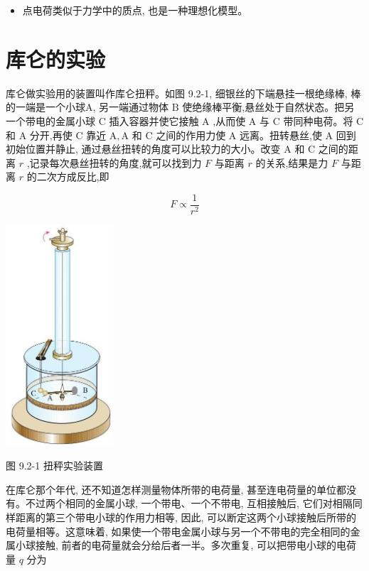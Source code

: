 \documentclass[10pt]{article}
\begin{document}
\begin{mdframed}

\begin{itemize}
\item 点电荷类似于力学中的质点, 也是一种理想化模型。
\end{itemize}

\end{mdframed}

\section*{库仑的实验}

库仑做实验用的装置叫作库仑扭秤。如图 9.2-1, 细银丝的下端悬挂一根绝缘棒, 棒的一端是一个小球A, 另一端通过物体 \(\mathrm{B}\) 使绝缘棒平衡,悬丝处于自然状态。把另一个带电的金属小球 \(\mathrm{C}\) 插入容器并使它接触 \(\mathrm{A}\) ,从而使 \(\mathrm{A}\) 与 \(\mathrm{C}\) 带同种电荷。将 \(\mathrm{C}\) 和 \(\mathrm{A}\) 分开,再使 \(\mathrm{C}\) 靠近 \(\mathrm{A},\mathrm{A}\) 和 \(\mathrm{C}\) 之间的作用力使 \(\mathrm{A}\) 远离。扭转悬丝,使 \(\mathrm{A}\) 回到初始位置并静止, 通过悬丝扭转的角度可以比较力的大小。改变 \(\mathrm{A}\) 和 \(\mathrm{C}\) 之间的距离 \(r\) ,记录每次悬丝扭转的角度,就可以找到力 \(F\) 与距离 \(r\) 的关系,结果是力 \(F\) 与距离 \(r\) 的二次方成反比,即

\[
F \propto \frac{1}{{r}^{2}}
\]

\begin{center}
\includegraphics[max width=0.3\textwidth]{images/01911d5f-8e38-70c0-b5b8-2b399bd115b6_12_298404.jpg}
\end{center}

图 9.2-1 扭秤实验装置

在库仑那个年代, 还不知道怎样测量物体所带的电荷量, 甚至连电荷量的单位都没有。不过两个相同的金属小球, 一个带电、一个不带电, 互相接触后, 它们对相隔同样距离的第三个带电小球的作用力相等, 因此, 可以断定这两个小球接触后所带的电荷量相等。这意味着, 如果使一个带电金属小球与另一个不带电的完全相同的金属小球接触, 前者的电荷量就会分给后者一半。多次重复, 可以把带电小球的电荷量 \(q\) 分为
\end{document}

